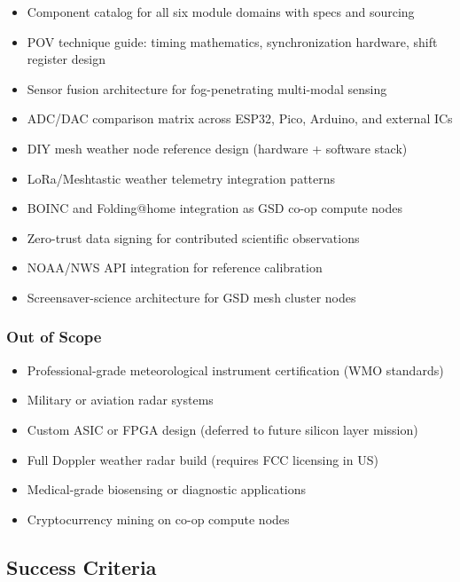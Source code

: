 \documentclass[11pt,letterpaper]{article}
\begin{document}
\begin{itemize}[leftmargin=1.5em]
  \item Component catalog for all six module domains with specs and sourcing
  \item POV technique guide: timing mathematics, synchronization hardware, shift register design
  \item Sensor fusion architecture for fog-penetrating multi-modal sensing
  \item ADC/DAC comparison matrix across ESP32, Pico, Arduino, and external ICs
  \item DIY mesh weather node reference design (hardware + software stack)
  \item LoRa/Meshtastic weather telemetry integration patterns
  \item BOINC and Folding@home integration as GSD co-op compute nodes
  \item Zero-trust data signing for contributed scientific observations
  \item NOAA/NWS API integration for reference calibration
  \item Screensaver-science architecture for GSD mesh cluster nodes
\end{itemize}

\subsubsection{Out of Scope}

\begin{itemize}[leftmargin=1.5em]
  \item Professional-grade meteorological instrument certification (WMO standards)
  \item Military or aviation radar systems
  \item Custom ASIC or FPGA design (deferred to future silicon layer mission)
  \item Full Doppler weather radar build (requires FCC licensing in US)
  \item Medical-grade biosensing or diagnostic applications
  \item Cryptocurrency mining on co-op compute nodes
\end{itemize}

\subsection{Success Criteria}
\end{document}
